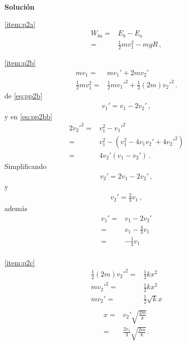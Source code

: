 \begin{enumerate}
  \begin{itemize}
  \item[\textbf{Solución}]
  \item[\ref{item:p2a}]
    \begin{align*}
      W_{ba}=&E_b-E_a\nonumber\\
      =&\tfrac{1}{2}m v_1^2-mgR\,,
    \end{align*}
  \item[\ref{item:p2b}] 
    \begin{align}
      \label{eq:pp2b}
      m v_1=&m v_1'+2m v_2'\\
      \label{eq:pp2bb}
      \tfrac{1}{2}m v_1^2=&\tfrac{1}{2}m {v_1'}^2+\tfrac{1}{2}(2m){v_2'}^2\,.
    \end{align}
    de \eqref{eq:pp2b}
    \begin{align*}
      v_1'=v_1-2v_2'\,,
    \end{align*}
    y en \eqref{eq:pp2bb}
    \begin{align*}
      2{v_2'}^2=&v_1^2-{v_1'}^2\nonumber\\
      =&v_1^2-(v_1^2-4 v_1 v_2'+4{v_2'}^2)\nonumber\\
      =&4v_2'(v_1-v_2')\,.
    \end{align*}
    Simplificando
    \begin{align*}
      v_2'=2v_1-2v_2'\,,
    \end{align*}
    y
    \begin{align*}
      v_2'=\tfrac{2}{3}v_1\,,
    \end{align*}
    además
    \begin{align*}
      v_1'=&v_1-2v_2'\nonumber\\
      =&v_1-\tfrac{4}{3}v_1\nonumber\\
      =&-\tfrac{1}{3}v_1\nonumber\\
    \end{align*}
  \item[\ref{item:p2c}]
    \begin{align*}
      \tfrac{1}{2}(2m){v_2'}^2=&\tfrac{1}{2}kx^2\nonumber\\
       m{v_2'}^2=&\tfrac{1}{2}kx^2\nonumber\\
       mv_2'=&\tfrac{1}{2}\sqrt{k}x\nonumber\\
    \end{align*}
    \begin{align*}
      x=&{v_2'}\sqrt{\frac{2m}{k}}\nonumber\\
      =&\frac{2v_1}{3}\sqrt{\frac{2m}{k}}\,.
    \end{align*}
  \end{itemize}



\end{enumerate}
